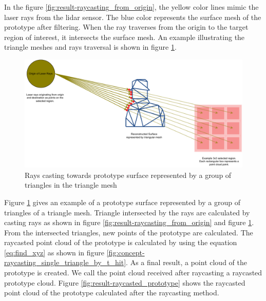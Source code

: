 In the figure \ref{fig:result-raycasting_from_origin}, the yellow color lines mimic the laser rays from the lidar sensor. The blue color represents the surface mesh of the prototype after filtering. When the ray traverses from the origin to the target region of interest, it intersects the surface mesh. An example illustrating the triangle meshes and rays traversal is shown in figure \ref{fig:result-raycasting_with_triangles}.

\begin{figure}[htbp]
    \centering
    \begin{minipage}[b]{0.8\textwidth}
    \centering
    \includegraphics[width=1\linewidth]{97_graphics/results/raycasting_with_trianglesmeshes.pdf}
    \caption{Rays casting towards prototype surface represented by a group of triangles in the triangle mesh}
    \label{fig:result-raycasting_with_triangles}
    \end{minipage}
\end{figure}

Figure \ref{fig:result-raycasting_with_triangles} gives an example of a prototype surface represented by a group of triangles of a triangle mesh. Triangle intersected by the rays are calculated by casting rays as shown in figure \ref{fig:result-raycasting_from_origin}  and figure  \ref{fig:result-raycasting_with_triangles}. From the intersected triangles, new points of the prototype are calculated. The raycasted point cloud of the prototype is calculated by using the equation \ref{eq:find_xyz} as shown in figure \ref{fig:concept-raycasting_single_triangle_by_t_hit}. As a final result, a point cloud of the prototype is created. We call the point cloud received after raycasting a raycasted prototype cloud. Figure \ref{fig:result-raycasted_prototype} shows the raycasted point cloud of the prototype calculated after the raycasting method.

